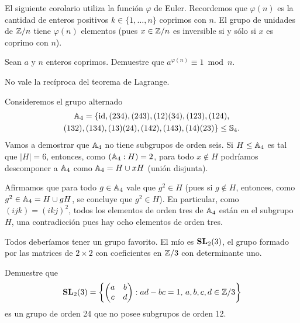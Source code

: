 El siguiente corolario utiliza la función $\varphi$ de Euler. Recordemos que
$\varphi(n)$ es la cantidad de enteros positivos $k\in\{1,\dots,n\}$ 
coprimos con $n$. El grupo de
unidades de $\mathbb{Z}/n$ tiene $\varphi(n)$ elementos (pues $x\in\mathbb{Z}/n$ es inversible
si y sólo si $x$ es coprimo con $n$). 

\begin{exercise}
	Sean $a$ y $n$ enteros coprimos. Demuestre que 
	$a^{\varphi(n)}\equiv1\bmod n$.
\end{exercise}

No vale la recíproca del teorema de Lagrange.

\begin{example}
Consideremos el grupo alternado 
\begin{multline*}
\mathbb{A}_4=\{\operatorname{id},(234),(243),(12)(34),(123),(124),\\(132),(134),(13)(24),(142),(143),(14)(23)\}\leq\mathbb{S}_4.	
\end{multline*}
Vamos a demostrar que $\mathbb{A}_4$ no tiene subgrupos de orden seis. Si $H\leq\mathbb{A}_4$ es tal que 
$|H|=6$, entonces, como $(\mathbb{A}_4:H)=2$, para todo $x\not\in H$ podríamos descomponer a $\mathbb{A}_4$ como $\mathbb{A}_4=H\cup xH$ (unión disjunta). 

Afirmamos que
para todo $g\in\mathbb{A}_4$ vale que $g^2\in H$ (pues si $g\not\in H$, entonces, como $g^2\in\mathbb{A}_4=H\cup gH$, se concluye que $g^2\in H$). En particular, como
$(ijk)=(ikj)^2$, 
todos los elementos de orden tres de $\mathbb{A}_4$ están en el subgrupo $H$, una contradicción pues hay ocho elementos de orden tres.   
\end{example}

Todos deberíamos tener un grupo favorito. El mío es $\mathbf{SL}_2(3)$,
el grupo formado por las matrices de $2\times2$ con coeficientes en $\mathbb{Z}/3$ 
con determinante uno.

\begin{exercise}
Demuestre que 
\[
\mathbf{SL}_2(3)=\left\{\begin{pmatrix}a&b\\c&d\end{pmatrix}:ad-bc=1,\,a,b,c,d\in\mathbb{Z}/3\right\}
\]
es un grupo de orden 24 que no posee subgrupos de orden 12.	
\end{exercise}


%


%
%


